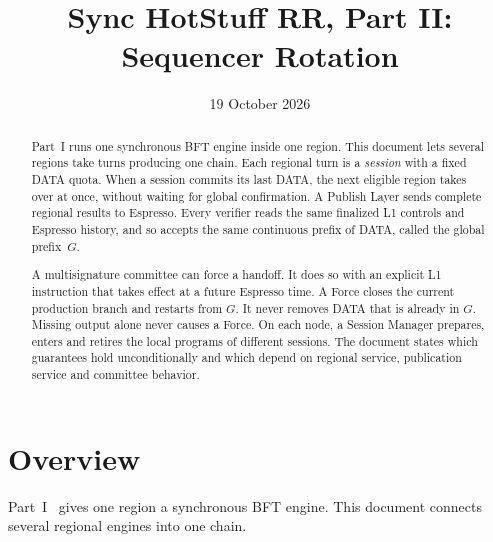 \documentclass[11pt,a4paper]{article}
\title{Sync HotStuff RR, Part II: Sequencer Rotation}
\author{}\date{19 October 2026}
\begin{document}
\maketitle
\begin{abstract}
Part~I runs one synchronous BFT engine inside one region. This document
lets several regions take turns producing one chain. Each regional turn
is a \emph{session} with a fixed DATA quota. When a session commits its
last DATA, the next eligible region takes over at once, without waiting
for global confirmation. A Publish Layer sends complete regional results
to Espresso. Every verifier reads the same finalized L1 controls and
Espresso history, and so accepts the same continuous prefix of DATA,
called the global prefix~$G$.

A multisignature committee can force a handoff. It does so with an
explicit L1 instruction that takes effect at a future Espresso time.
A Force closes the current production branch and restarts from $G$.
It never removes DATA that is already in $G$. Missing output alone never
causes a Force. On each node, a Session Manager prepares, enters and
retires the local programs of different sessions. The document states
which guarantees hold unconditionally and which depend on regional
service, publication service and committee behavior.
\end{abstract}

\section{Overview}
\label{sec:overview}
Part~I~\cite{part1} gives one region a synchronous BFT engine.
This document connects several regional engines into one chain.
\end{document}
